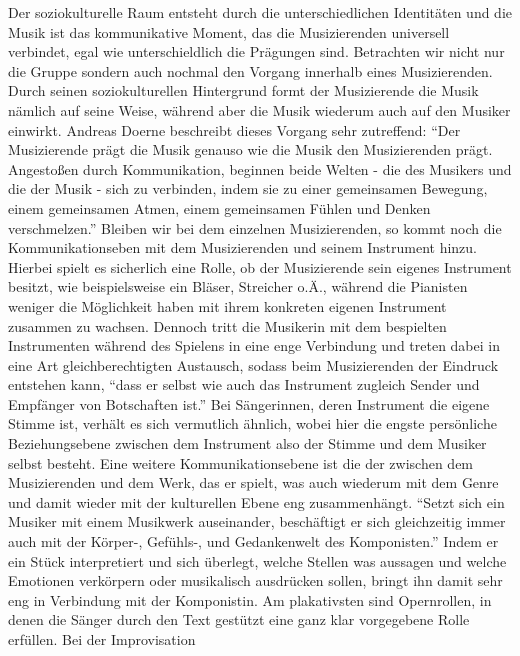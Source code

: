 \autocite[56]{doerne:umfassend_musizieren} Der soziokulturelle Raum entsteht
durch die unterschiedlichen Identitäten und die Musik ist das kommunikative
Moment, das die Musizierenden universell verbindet, egal wie unterschieldlich
die Prägungen sind. Betrachten wir nicht nur die Gruppe sondern auch nochmal den
Vorgang innerhalb eines Musizierenden. Durch seinen soziokulturellen Hintergrund
formt der Musizierende die Musik nämlich auf seine Weise, während aber die Musik
wiederum auch auf den Musiker einwirkt. Andreas Doerne beschreibt dieses Vorgang
sehr zutreffend: \enquote{Der Musizierende prägt die Musik genauso wie die Musik den
Musizierenden prägt. Angestoßen durch Kommunikation, beginnen beide Welten - die
des Musikers und die der Musik - sich zu verbinden, indem sie zu einer
gemeinsamen Bewegung, einem gemeinsamen Atmen, einem gemeinsamen Fühlen und
Denken verschmelzen.} \autocite[60]{doerne:umfassend_musizieren} Bleiben wir bei
dem einzelnen Musizierenden, so kommt noch die Kommunikationseben mit dem
Musizierenden und seinem Instrument hinzu. Hierbei spielt es sicherlich eine
Rolle, ob der Musizierende sein eigenes Instrument besitzt, wie beispielsweise
ein Bläser, Streicher o.Ä., während die Pianisten weniger die Möglichkeit haben
mit ihrem konkreten eigenen Instrument zusammen zu wachsen. Dennoch tritt die
Musikerin mit dem bespielten Instrumenten während des Spielens in eine enge
Verbindung und treten dabei in eine Art gleichberechtigten Austausch, sodass
beim Musizierenden der Eindruck entstehen kann, \enquote{dass er selbst wie auch das
Instrument zugleich Sender und Empfänger von Botschaften ist.}
\autocite[59]{doerne:umfassend_musizieren} Bei Sängerinnen, deren Instrument die
eigene Stimme ist, verhält es sich vermutlich ähnlich, wobei hier die engste
persönliche Beziehungsebene zwischen dem Instrument also der Stimme und dem
Musiker selbst besteht. Eine weitere Kommunikationsebene ist die der zwischen
dem Musizierenden und dem Werk, das er spielt, was auch wiederum mit dem Genre
und damit wieder mit der kulturellen Ebene eng zusammenhängt. \enquote{Setzt sich ein
Musiker mit einem Musikwerk auseinander, beschäftigt er sich gleichzeitig immer
auch mit der Körper-, Gefühls-, und Gedankenwelt des Komponisten.}
\autocite[59]{doerne:umfassend_musizieren} Indem er ein Stück interpretiert und
sich überlegt, welche Stellen was aussagen und welche Emotionen verkörpern oder
musikalisch ausdrücken sollen, bringt ihn damit sehr eng in Verbindung mit der
Komponistin. Am plakativsten sind Opernrollen, in denen die Sänger durch den
Text gestützt eine ganz klar vorgegebene Rolle erfüllen. Bei der Improvisation
